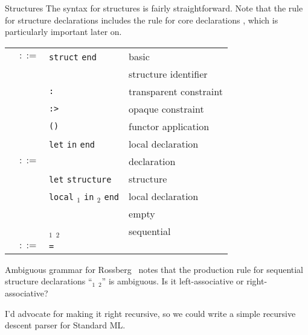 \begin{grammar}{Structures}
  The syntax for structures is fairly straightforward. Note that
  the rule for structure declarations  includes the
  rule for core declarations , which is particularly
  important later on.
\begin{longtable}{rcll}
\label{grammar:strexp}\nonterminal{strexp} & $::=$ & \texttt{struct} \nonterminal{strdec} \texttt{end}
& basic\\
& \alt & \nonterminal{longstrid} & structure identifier\\
&\alt& \nonterminal{strexp} \texttt{:} \hyperref[grammar:sigexp]{\nonterminal{sigexp}} & transparent constraint\\
&\alt& \nonterminal{strexp} \texttt{:>} \hyperref[grammar:sigexp]{\nonterminal{sigexp}} & opaque constraint\\
&\alt& \nonterminal{funid}\texttt{(}\nonterminal{strexp}\texttt{)} & functor application\\
&\alt&\texttt{let} \nonterminal{strdec} \texttt{in} \nonterminal{strexp} \texttt{end} & local declaration\\
\label{grammar:strdec}\nonterminal{strdec} & $::=$ & \hyperref[grammar:dec]{\nonterminal{dec}}
& declaration\\
&\alt&\texttt{let} \texttt{structure} \nonterminal{strbind} & structure\\
&\alt&\texttt{local} \nonterminal{strdec}$_{1}$ \texttt{in} \nonterminal{strdec}$_{2}$ \texttt{end} & local declaration\\
&\alt& & empty\\
&\alt&\nonterminal{strdec}$_{1}$ \optional{\texttt{;}} \nonterminal{strdec}$_{2}$ & sequential\\
\label{grammar:strbind}\nonterminal{strbind} & $::=$ & \nonterminal{strid} \texttt{=} \nonterminal{strexp} \optional{\texttt{and} \nonterminal{strbind}} & \\
\end{longtable}
\end{grammar}

\begin{remark}{Ambiguous grammar for }
Rossberg~\cite{rossbert2018defects} notes that the production rule for
sequential structure declarations ``$_{1}$ \optional{\texttt{;}} $_{2}$''
is ambiguous. Is it left-associative or right-associative?

I'd advocate for making it right recursive, so we could write a simple
recursive descent parser for Standard ML.
\end{remark}

